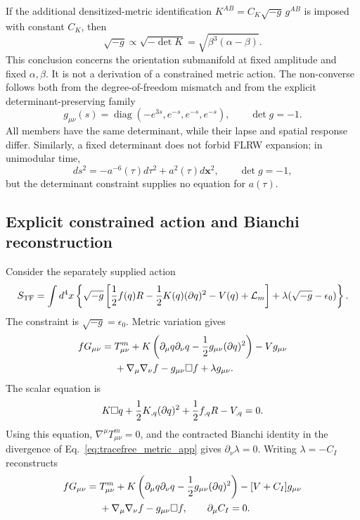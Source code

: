 If the additional densitized-metric identification
$K^{AB}=C_K\sqrt{-g}\,g^{AB}$ is imposed with constant $C_K$, then
\begin{equation}
 \sqrt{-g}\propto\sqrt{-\det K}
 =\sqrt{\beta^3(\alpha-\beta)}.
 \label{eq:sqrt_g_value_app}
\end{equation}
This conclusion concerns the orientation submanifold at fixed amplitude and
fixed $\alpha,\beta$.  It is not a derivation of a constrained metric action.
The non-converse follows both from the degree-of-freedom mismatch and from
the explicit determinant-preserving family
\begin{equation}
 g_{\mu\nu}(s)=\operatorname{diag}
 (-e^{3s},e^{-s},e^{-s},e^{-s}),\qquad \det g=-1.
 \label{eq:fixed_det_counterfamily_app}
\end{equation}
All members have the same determinant, while their lapse and spatial
response differ.  Similarly, a fixed determinant does not forbid FLRW
expansion; in unimodular time,
\begin{equation}
 ds^2=-a^{-6}(\tau)d\tau^2+a^2(\tau)d\mathbf x^2,
 \qquad\det g=-1,
 \label{eq:unimodular_flrw_app}
\end{equation}
but the determinant constraint supplies no equation for $a(\tau)$.

\subsection{Explicit constrained action and Bianchi reconstruction}
\label{app:jacobian_cc}

Consider the separately supplied action
\begin{equation}
 S_{\rm TF}=\int d^4x\left\{\sqrt{-g}\left[
 {1\over2}f(q)R-{1\over2}K(q)(\partial q)^2-V(q)
 +\mathcal L_m\right]
 +\lambda(\sqrt{-g}-\epsilon_0)\right\}.
 \label{eq:tracefree_action_app}
\end{equation}
The constraint is $\sqrt{-g}=\epsilon_0$.  Metric variation gives
\begin{align}
 fG_{\mu\nu}={}&T^m_{\mu\nu}
 +K\left(\partial_\mu q\partial_\nu q
 -{1\over2}g_{\mu\nu}(\partial q)^2\right)-Vg_{\mu\nu}
 \nonumber\\
 &+\nabla_\mu\nabla_\nu f-g_{\mu\nu}\Box f
 +\lambda g_{\mu\nu}.
 \label{eq:tracefree_metric_app}
\end{align}
The scalar equation is
\begin{equation}
 K\Box q+{1\over2}K_{,q}(\partial q)^2
 +{1\over2}f_{,q}R-V_{,q}=0.
 \label{eq:tracefree_scalar_app}
\end{equation}
Using this equation, $\nabla^\mu T^m_{\mu\nu}=0$, and the contracted
Bianchi identity in the divergence of
Eq.~\eqref{eq:tracefree_metric_app} gives
$\partial_\nu\lambda=0$.  Writing $\lambda=-C_I$ reconstructs
\begin{align}
 fG_{\mu\nu}={}&T^m_{\mu\nu}
 +K\left(\partial_\mu q\partial_\nu q
 -{1\over2}g_{\mu\nu}(\partial q)^2\right)
 -[V+C_I]g_{\mu\nu}\nonumber\\
 &+\nabla_\mu\nabla_\nu f-g_{\mu\nu}\Box f,
 \qquad \partial_\mu C_I=0.
 \label{eq:tracefree_reconstructed_app}
\end{align}

